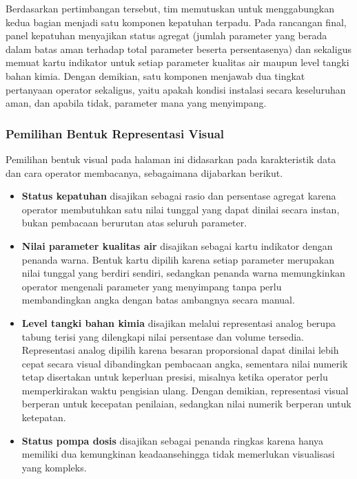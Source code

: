 Berdasarkan pertimbangan tersebut, tim memutuskan untuk menggabungkan kedua bagian menjadi satu komponen 
kepatuhan terpadu. Pada rancangan final, panel kepatuhan menyajikan status agregat (jumlah parameter yang berada 
dalam batas aman terhadap total parameter beserta persentasenya) dan sekaligus memuat kartu indikator untuk 
setiap parameter kualitas air maupun level tangki bahan kimia. Dengan demikian, satu komponen menjawab dua 
tingkat pertanyaan operator sekaligus, yaitu apakah kondisi instalasi secara keseluruhan aman, dan apabila tidak, 
parameter mana yang menyimpang.

\subsubsection{Pemilihan Bentuk Representasi Visual}
Pemilihan bentuk visual pada halaman ini didasarkan pada karakteristik data dan cara operator membacanya, 
sebagaimana dijabarkan berikut.

\begin{itemize}
    \item \textbf{Status kepatuhan} disajikan sebagai rasio dan persentase agregat karena operator membutuhkan 
    satu nilai tunggal yang dapat dinilai secara instan, bukan pembacaan berurutan atas seluruh parameter.
    
    \item \textbf{Nilai parameter kualitas air} disajikan sebagai kartu indikator dengan penanda warna. Bentuk 
    kartu dipilih karena setiap parameter merupakan nilai tunggal yang berdiri sendiri, sedangkan penanda warna 
    memungkinkan operator mengenali parameter yang menyimpang tanpa perlu membandingkan angka dengan batas 
    ambangnya secara manual.
    
    \item \textbf{Level tangki bahan kimia} disajikan melalui representasi analog berupa tabung terisi yang 
    dilengkapi nilai persentase dan volume tersedia. Representasi analog dipilih karena besaran proporsional 
    dapat dinilai lebih cepat secara visual dibandingkan pembacaan angka, sementara nilai numerik tetap 
    disertakan untuk keperluan presisi, misalnya ketika operator perlu memperkirakan waktu pengisian ulang. 
    Dengan demikian, representasi visual berperan untuk kecepatan penilaian, sedangkan nilai numerik berperan 
    untuk ketepatan.
    
    \item \textbf{Status pompa dosis} disajikan sebagai penanda ringkas karena hanya memiliki dua kemungkinan 
    keadaansehingga tidak memerlukan visualisasi yang kompleks.
\end{itemize}

